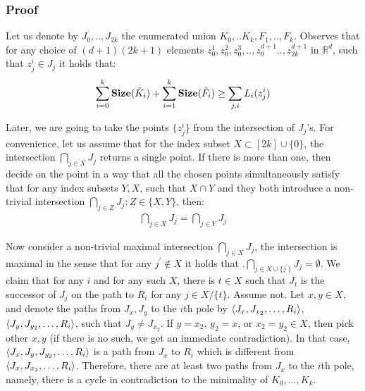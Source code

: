 \documentclass{beamer}
\begin{document}
\begin{frame}
  \frametitle{Proof} 

    Let us denote by $J_{0},..,J_{2k}$ the enumerated union $K_{0},..K_{k},F_{1},..,F_{k}$. Observes that for any choice of $(d+1)(2k+1)$ elements $z_{0}^{1},z_{0}^{2}, z_{0}^{3},..,z_{0}^{d+1}..,z_{2k}^{d+1}$ in $\mathbb{R}^{d}$, such that $z_{j}^{i} \in J_{j}$ it holds that:
    \begin{equation}
      \label{equ:spanlow}
      \begin{split}
         \sum^{k}_{i=0}\mathbf{Size}(\hat{K}_{i}) + \sum^{k}_{i=1}\mathbf{Size}(\hat{F}_{i})  \ge \sum_{j,i}L_{i}(z_{j}^{i})
      \end{split}
    \end{equation}

Later, we are going to take the points $\{z_{j}^{i}\}$ from the intersection of $J_{j}$'s. For convenience, let us assume that for the index subset $X \subset [2k]\cup\{0\}$, the intersection $\bigcap_{j \in X}J_{j}$ returns a single point. If there is more than one, then decide on the point in a way that all the chosen points simultaneously satisfy that for any index subsets $Y, X$, such that $X \cap Y$ and they both introduce a non-trivial intersection $\bigcap_{j \in Z} J_{j} : Z\in \{X,Y\}$, then:
    \begin{equation*}
      \begin{split}
        \bigcap_{j \in X} J_{j} = \bigcap_{j \in Y } J_{j} 
      \end{split}
    \end{equation*}

    Now consider a non-trivial maximal intersection $\bigcap_{j \in X} J_{j}$, the intersection is maximal in the sense that for any $j^{\prime} \notin X$ it holds that .$\bigcap_{j \in X\cup \{j^{\prime} \}} J_{j} = \emptyset$. We claim that for any $i$ and for any such $X$, there is $t \in X$ such that $J_{t}$ is the successor of $J_{j}$ on the path to $R_{i}$ for any $j \in X/\{t\}$. Assume not. Let $x, y \in X$, and denote the paths from $J_{x}, J_{y}$ to the $i$th pole by $\braket{J_{x}, J_{x_2}, \ldots, R_{i}}$, $\braket{J_{y}, J_{y_2}, \ldots, R_{i}}$, such that $J_{y} \neq J_{x_{2}}$. If $y = x_{2}$, $y_{2} = x$, or $x_{2} = y_{2} \in X$, then pick other $x, y$ (if there is no such, we get an immediate contradiction). In that case, $\braket{J_{x}, J_{y}, J_{y_{2}}, \ldots, R_{i}}$ is a path from $J_{x}$ to $R_{i}$ which is different from $\braket{J_{x}, J_{x_{2}}, \ldots, R_{i}}$. Therefore, there are at least two paths from $J_{x}$ to the $i$th pole, namely, there is a cycle in contradiction to the minimality of $K_{0}, \ldots, K_{k}$.



\end{frame}
\end{document}
